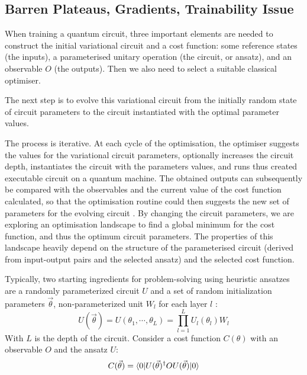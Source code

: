 \subsection{Barren Plateaus, Gradients, Trainability Issue} \label{Barren Plateaus section}

When training a quantum circuit, three important elements are needed to construct the initial variational circuit and a cost function: some reference states (the inputs), a parameterised unitary operation (the circuit, or ansatz), and an observable $O$ (the outputs). Then we also need to select a suitable classical optimiser.

The next step is to evolve this variational circuit from the initially random state of circuit parameters to the circuit instantiated with the optimal parameter values.

The process is iterative. At each cycle of the optimisation, the optimiser suggests the values for the variational circuit parameters, optionally increases the circuit depth, instantiates the circuit with the parameters values, and runs thus created executable circuit on a quantum machine.
The obtained outputs can subsequently be compared with the observables and the current value of the cost function calculated, so that the optimisation routine could then suggests the new set of parameters for the evolving circuit \cite{cerezo2021variational}.
By changing the circuit parameters, we are exploring an optimisation landscape to find a global minimum for the cost function, and thus the optimum circuit parameters.
The properties of this landscape heavily depend on the structure of the parameterised circuit (derived from input-output pairs and the selected ansatz) and the selected cost function.

Typically, two starting ingredients for problem-solving using heuristic ansatzes are a randomly parameterized circuit $U$ and a set of random initialization parameters $\vec{\theta}$, non-parameterized unit $W_l$ for each layer $l$ \cite{mccleanBarrenPlateausQuantum2018}:
\begin{equation}\label{Parameterized Circuit}
    U(\vec{\theta})
    = U(\theta_1, \cdots, \theta_L)
    = \prod_{l=1}^L U_l(\theta_l)W_l
\end{equation}
With $L$ is the depth of the circuit. Consider a cost function $C(\theta)$ with an observable $O$ and the ansatz $U$:
\begin{equation}
    C(\vec{\theta})
    = \bra{0} U(\vec{\theta})^\dagger OU(\vec{\theta}) \ket{0}
\end{equation}

